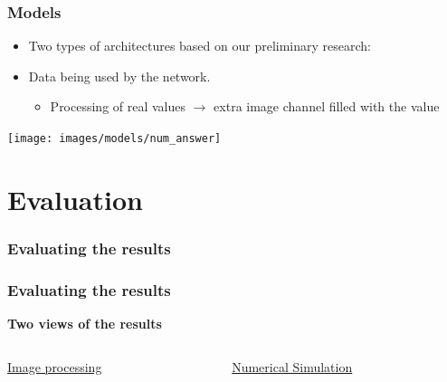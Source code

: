 \documentclass[18pt]{beamer}
\begin{document}
\begin{frame}[t]
  \frametitle{Models}
  \begin{itemize}
  \item Two types of architectures based on our preliminary research:
  \item Data being used by the network.
    \begin{itemize}
    \item Processing of real values $\rightarrow$ extra image channel filled with the value
    \end{itemize}
  \end{itemize}

  \vspace{0.3cm}
    \begin{center}
    \texttt{[image: images/models/num\_answer]}
  \end{center}
  
\end{frame}

\section{Evaluation}

\begin{frame}
  \frametitle{Evaluating the results}
\end{frame}

\begin{frame}[t]
  \frametitle{Evaluating the results}
  \begin{center}
    \textbf{\Large Two views of the results}
  \end{center}
  \vspace{-1cm}
  \begin{columns}[t]
    \begin{column}{0.5\textwidth}
      \begin{center}
        {\large \underline{Image processing}}
      \end{center}
    \end{column}
    \begin{column}{0.5\textwidth}
      \begin{center}
        {\large \underline{Numerical Simulation}}
      \end{center}  
    \end{column}
  \end{columns}
\end{frame}
\end{document}
